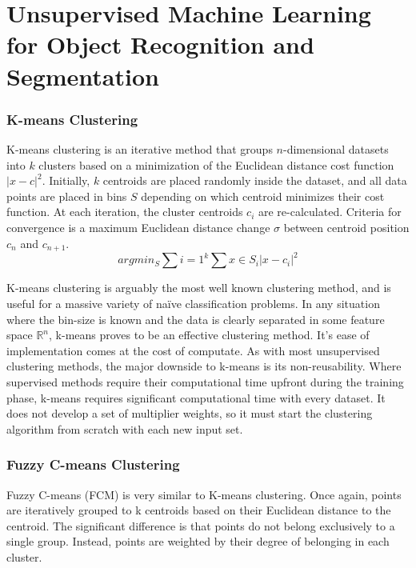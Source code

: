 \documentclass[12pt]{drexelthesis}
\let\Oldsection\section
\renewcommand{\section}{\FloatBarrier\Oldsection}
\let\Oldsubsubsection\subsubsection
\renewcommand{\subsubsection}{\FloatBarrier\Oldsubsubsection}
\begin{document}
 


\section{Unsupervised Machine Learning for Object Recognition and Segmentation}
\label{sec:machinelearning}

\subsubsection{K-means Clustering}
K-means clustering is an iterative method that groups $n$-dimensional datasets into $k$ clusters based on a minimization of the Euclidean distance cost function $|x-c|^{2}$. Initially, $k$ centroids are placed randomly inside the dataset, and all data points are placed in bins $S$ depending on which centroid minimizes their cost function. At each iteration, the cluster centroids $c_{i}$ are re-calculated. Criteria for convergence is a maximum Euclidean distance change $\sigma$ between centroid position $c_{n}$ and $c_{n+1}$.
\begin{equation}
	arg min_{S} \sum{i=1}^{k} \sum{x \in S_{i}} |x - c_{i}|^{2}
\end{equation}

K-means clustering is arguably the most well known clustering method, and is useful for a massive variety of naïve classification problems. In any situation where the bin-size is known and the data is clearly separated in some feature space $\mathbb{R}^{n}$, k-means proves to be an effective clustering method. It's ease of implementation comes at the cost of computate. As with most unsupervised clustering methods, the major downside to k-means is its non-reusability. Where supervised methods require their computational time upfront during the training phase, k-means requires significant computational time with every dataset. It does not develop a set of multiplier weights, so it must start the clustering algorithm from scratch with each new input set.

\subsubsection{Fuzzy C-means Clustering}

Fuzzy C-means (FCM) is very similar to K-means clustering. Once again, points are iteratively grouped to k centroids based on their Euclidean distance to the centroid. The significant difference is that points do not belong exclusively to a single group. Instead, points are weighted by their degree of belonging in each cluster.
\end{document}
